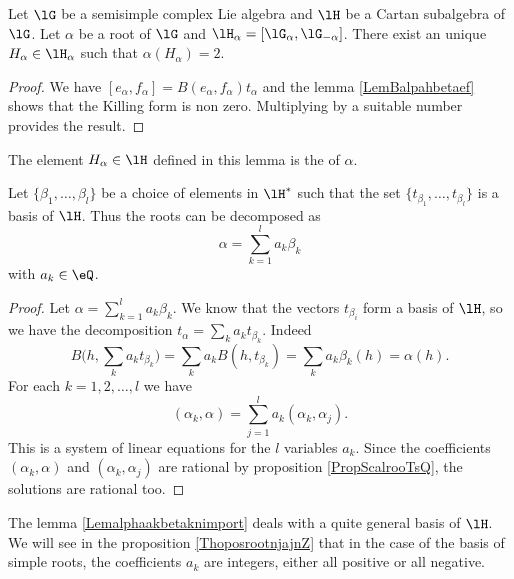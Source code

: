 \begin{corollary}       \label{CorrExistInverseRoot}
    Let \( \lG\) be a semisimple complex Lie algebra and \( \lH\) be a Cartan subalgebra of \( \lG\). Let \( \alpha\) be a root of \( \lG\) and \( \lH_{\alpha}=[\lG_{\alpha},\lG_{-\alpha}]\). There exist an unique \( H_{\alpha}\in\lH_{\alpha}\) such that \( \alpha(H_{\alpha})=2\).
\end{corollary}

\begin{proof}
    We have \( [e_{\alpha},f_{\alpha}]=B(e_{\alpha},f_{\alpha})t_{\alpha}\) and the lemma \ref{LemBalpahbetaef} shows that the Killing form is non zero. Multiplying by a suitable number provides the result.
\end{proof}
The element \( H_{\alpha}\in\lH\) defined in this lemma is the  of \( \alpha\).

\begin{lemma}       \label{Lemalphaakbetaknimport}
    Let \( \{ \beta_1,\ldots,\beta_l \}\) be a choice of elements in \( \lH^*\) such that the set \( \{ t_{\beta_1},\ldots,t_{\beta_l} \}\) is a basis of \( \lH\). Thus the roots can be decomposed as
    \begin{equation}
        \alpha=\sum_{k=1}^la_k\beta_k
    \end{equation}
    with \( a_k\in\eQ\).
\end{lemma}

\begin{proof}

    Let \( \alpha=\sum_{k=1}^la_k\beta_k\). We know that the vectors \( t_{\beta_i}\) form a basis of \( \lH\), so we have the decomposition \( t_{\alpha}=\sum_ka_kt_{\beta_k}\). Indeed
    \begin{equation}
        B\big( h,\sum_k a_kt_{\beta_k} \big)=\sum_ka_k B(h,t_{\beta_k})=\sum_ka_k\beta_k(h)=\alpha(h).
    \end{equation}
    For each \( k=1,2,\ldots,l\) we have
    \begin{equation}
        (\alpha_k, \alpha) =\sum_{j=1}^la_k(\alpha_k, \alpha_j).
    \end{equation}
    This is a system of linear equations for the \( l\) variables \( a_k\). Since the coefficients \( (\alpha_k,\alpha)\) and \( (\alpha_k,\alpha_j)\) are rational by proposition \ref{PropScalrooTsQ}, the solutions are rational too.
\end{proof}

\begin{remark}
    The lemma \ref{Lemalphaakbetaknimport} deals with a quite general basis of \( \lH\). We will see in the proposition \ref{ThoposrootnjajnZ} that in the case of the basis of simple roots, the coefficients \( a_k\) are integers, either all positive or all negative.
\end{remark}

